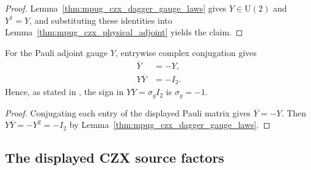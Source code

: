 \begin{proof}\leanok
    Lemma~\ref{thm:mpug_czx_dagger_gauge_laws} gives $Y\in\mathrm{U}(2)$
    and $Y^\dagger=Y$, and substituting these identities into
    Lemma~\ref{thm:mpug_czx_physical_adjoint} yields the claim.
\end{proof}

\begin{lemma}
    \label{thm:mpug_czx_dagger_sign}
    \leanok
    For the Pauli adjoint gauge $Y$, entrywise complex conjugation gives
    \begin{align}
        \overline{Y}  & =-Y,   \\
        Y\overline{Y} & =-I_2.
    \end{align}
    Hence, as stated in \cite[lines~4547--4559]{FrancoRubio2025MPUGauging},
    the sign in $Y\overline{Y}=\sigma_g I_2$ is $\sigma_g=-1$.
\end{lemma}

\begin{proof}\leanok
    Conjugating each entry of the displayed Pauli matrix gives
    $\overline{Y}=-Y$. Then $Y\overline{Y}=-Y^2=-I_2$ by
    Lemma~\ref{thm:mpug_czx_dagger_gauge_laws}.
\end{proof}

\subsection{The displayed CZX source factors}

